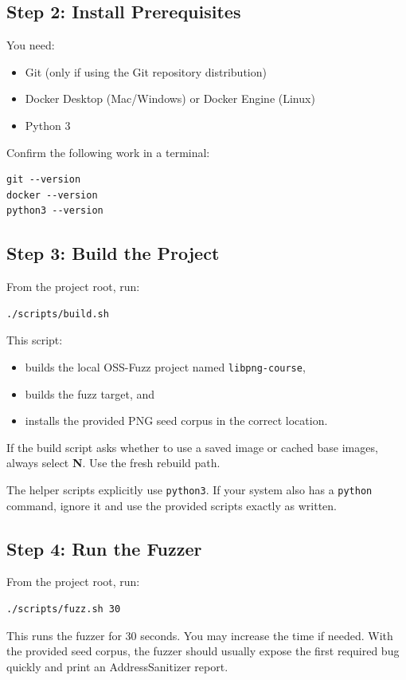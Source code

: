 \documentclass[11pt]{article}
\begin{document}
\subsection*{Step 2: Install Prerequisites}
You need:
\begin{itemize}
    \item Git (only if using the Git repository distribution)
    \item Docker Desktop (Mac/Windows) or Docker Engine (Linux)
    \item Python 3
\end{itemize}

Confirm the following work in a terminal:
\begin{lstlisting}[style=bashstyle]
git --version
docker --version
python3 --version
\end{lstlisting}

\subsection*{Step 3: Build the Project}
From the project root, run:
\begin{lstlisting}[style=bashstyle]
./scripts/build.sh
\end{lstlisting}

This script:
\begin{itemize}
    \item builds the local OSS-Fuzz project named \texttt{libpng-course},
    \item builds the fuzz target, and
    \item installs the provided PNG seed corpus in the correct location.
\end{itemize}

If the build script asks whether to use a saved image or cached base images, always select \textbf{N}. Use the fresh rebuild path.

The helper scripts explicitly use \texttt{python3}. If your system also has a \texttt{python} command, ignore it and use the provided scripts exactly as written.

\subsection*{Step 4: Run the Fuzzer}
From the project root, run:
\begin{lstlisting}[style=bashstyle]
./scripts/fuzz.sh 30
\end{lstlisting}

This runs the fuzzer for 30 seconds. You may increase the time if needed. With the provided seed corpus, the fuzzer should usually expose the first required bug quickly and print an AddressSanitizer report.
\end{document}
